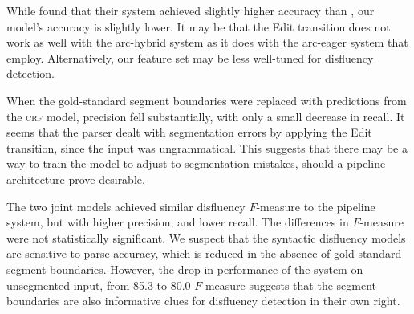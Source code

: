 \documentclass[11pt,letterpaper]{article}
\begin{document}
While \citet{honnibal:14} found that their system achieved slightly higher
accuracy than \citet{qian:13}, our model's accuracy is slightly lower.  It
may be that the Edit transition does not work as well with the arc-hybrid
system as it does with the arc-eager system that \citeauthor{honnibal:14} employ.
Alternatively, our feature set may be less well-tuned for disfluency detection.

When the gold-standard segment boundaries were replaced with predictions from the
\textsc{crf} model, precision fell substantially, with only a small decrease
in recall.  It seems that the parser dealt with segmentation errors by applying
the Edit transition, since the input was ungrammatical.  This suggests that there
may be a way to train the model to adjust to segmentation mistakes, should a
pipeline architecture prove desirable.

The two joint models achieved similar disfluency $F$-measure to the
pipeline system, but with higher precision, and lower recall.  
The differences in $F$-measure were not statistically significant. 
We suspect that
the syntactic disfluency models are sensitive to parse accuracy, which is reduced
in the absence of gold-standard segment boundaries.  However, the drop in performance
of the \citet{qian:13} system on unsegmented input, from 85.3 to 80.0 $F$-measure
suggests that the segment boundaries are also informative clues for disfluency
detection in their own right.

%
%
%
%
\end{document}
